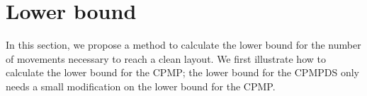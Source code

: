 \documentclass[review,3p,times,authoryear,12pt]{elsarticle}
\newtheorem{theorem}{Theorem}
\begin{document}
\section{Lower bound}
\label{sec:cf}

In this section, we propose a method to calculate the lower bound for the number of movements necessary to reach a clean layout. We first illustrate how to calculate the lower bound for the CPMP; the lower bound for the CPMPDS only needs a small modification on the lower bound for the CPMP.

%
%
%
\end{document}
